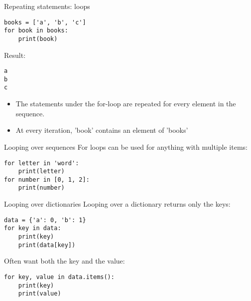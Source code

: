 \documentclass[aspectratio=169,usenames,dvipsnames]{beamer}
\begin{document}
\begin{frame}[fragile]{Repeating statements: loops}
\begin{lstlisting}
books = ['a', 'b', 'c']
for book in books:
    print(book)
\end{lstlisting}
Result:
\begin{lstlisting}
a
b
c
\end{lstlisting}

\begin{itemize}
\item The statements under the for-loop are repeated
    for every element in the sequence.
\item At every iteration, 'book' contains an element of 'books'
\end{itemize}
\end{frame}

\begin{frame}[fragile]{Looping over sequences}
For loops can be used for anything with multiple items:
\begin{lstlisting}
for letter in 'word':
    print(letter)
for number in [0, 1, 2]:
    print(number)
\end{lstlisting}
\end{frame}

\begin{frame}[fragile]{Looping over dictionaries}
Looping over a dictionary returns only the keys:
\begin{lstlisting}
data = {'a': 0, 'b': 1}
for key in data:
    print(key)
    print(data[key])
\end{lstlisting}

\pause
Often want both the key and the value:
\begin{lstlisting}
for key, value in data.items():
    print(key)
    print(value)
\end{lstlisting}
\end{frame}
\end{document}
